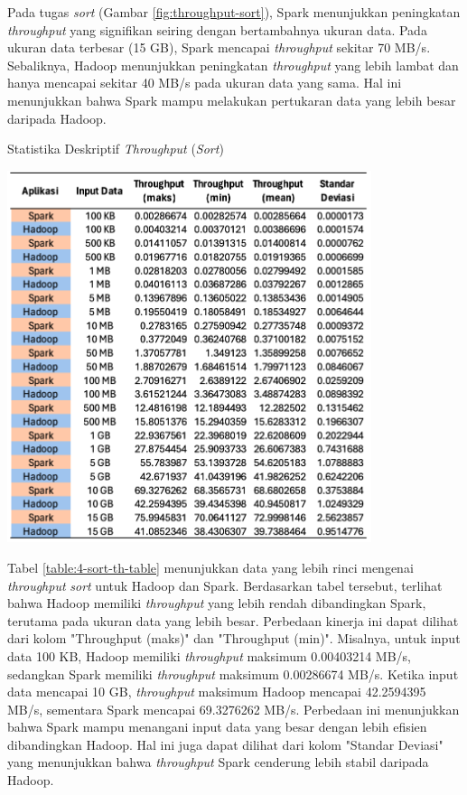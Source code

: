 Pada tugas \textit{sort} (Gambar \ref{fig:throughput-sort}), Spark menunjukkan peningkatan \textit{throughput} yang signifikan seiring dengan bertambahnya ukuran data. Pada ukuran data terbesar (15 GB), Spark mencapai \textit{throughput} sekitar 70 MB/s. Sebaliknya, Hadoop menunjukkan peningkatan \textit{throughput} yang lebih lambat dan hanya mencapai sekitar 40 MB/s pada ukuran data yang sama. Hal ini menunjukkan bahwa Spark mampu melakukan pertukaran data yang lebih besar daripada Hadoop.

\begin{table}[h]
  \centering
  \caption{Statistika Deskriptif \textit{Throughput} (\textit{Sort})}
  \includegraphics[width=0.8\textwidth]{figures/ch04/4-sort-th-table}
  \label{table:4-sort-th-table}
\end{table}

Tabel \ref{table:4-sort-th-table} menunjukkan data yang lebih rinci mengenai \textit{throughput} \textit{sort} untuk Hadoop dan Spark. Berdasarkan tabel tersebut, terlihat bahwa Hadoop memiliki \textit{throughput} yang lebih rendah dibandingkan Spark, terutama pada ukuran data yang lebih besar.
Perbedaan kinerja ini dapat dilihat dari kolom "Throughput (maks)" dan "Throughput (min)". Misalnya, untuk input data 100 KB, Hadoop memiliki \textit{throughput} maksimum 0.00403214 MB/s, sedangkan Spark memiliki \textit{throughput} maksimum 0.00286674 MB/s. Ketika input data mencapai 10 GB, \textit{throughput} maksimum Hadoop mencapai 42.2594395 MB/s, sementara Spark mencapai 69.3276262 MB/s. Perbedaan ini menunjukkan bahwa Spark mampu menangani input data yang besar dengan lebih efisien dibandingkan Hadoop. Hal ini juga dapat dilihat dari kolom "Standar Deviasi" yang menunjukkan bahwa \textit{throughput} Spark cenderung lebih stabil daripada Hadoop.


